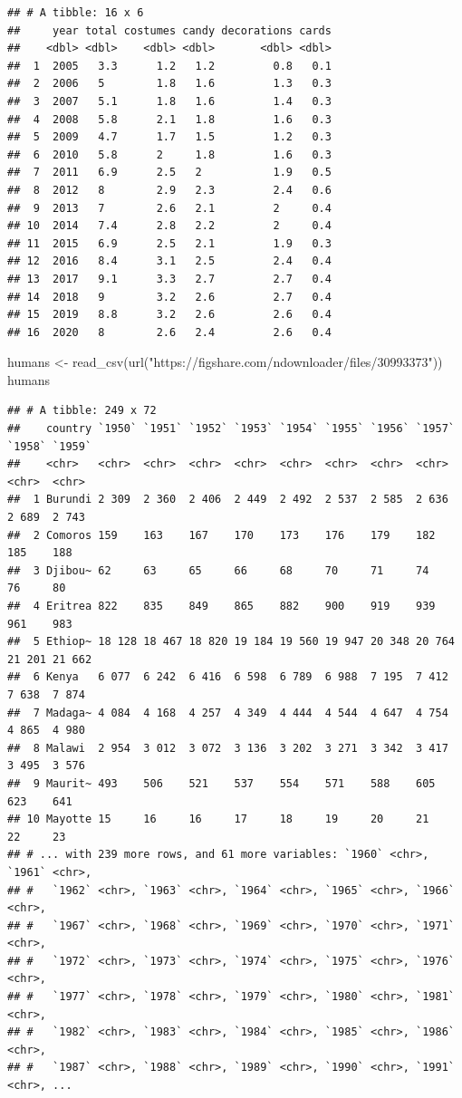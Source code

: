 \documentclass[
]{book}
\newenvironment{Shaded}{\begin{snugshade}}{\end{snugshade}}
\newcommand{\FunctionTok}[1]{\textcolor[rgb]{0.00,0.00,0.00}{#1}}
\newcommand{\NormalTok}[1]{#1}
\newcommand{\OtherTok}[1]{\textcolor[rgb]{0.56,0.35,0.01}{#1}}
\newcommand{\StringTok}[1]{\textcolor[rgb]{0.31,0.60,0.02}{#1}}
\begin{document}
\begin{verbatim}
## # A tibble: 16 x 6
##     year total costumes candy decorations cards
##    <dbl> <dbl>    <dbl> <dbl>       <dbl> <dbl>
##  1  2005   3.3      1.2   1.2         0.8   0.1
##  2  2006   5        1.8   1.6         1.3   0.3
##  3  2007   5.1      1.8   1.6         1.4   0.3
##  4  2008   5.8      2.1   1.8         1.6   0.3
##  5  2009   4.7      1.7   1.5         1.2   0.3
##  6  2010   5.8      2     1.8         1.6   0.3
##  7  2011   6.9      2.5   2           1.9   0.5
##  8  2012   8        2.9   2.3         2.4   0.6
##  9  2013   7        2.6   2.1         2     0.4
## 10  2014   7.4      2.8   2.2         2     0.4
## 11  2015   6.9      2.5   2.1         1.9   0.3
## 12  2016   8.4      3.1   2.5         2.4   0.4
## 13  2017   9.1      3.3   2.7         2.7   0.4
## 14  2018   9        3.2   2.6         2.7   0.4
## 15  2019   8.8      3.2   2.6         2.6   0.4
## 16  2020   8        2.6   2.4         2.6   0.4
\end{verbatim}

\begin{Shaded}
\begin{Highlighting}[]
\NormalTok{humans }\OtherTok{\textless{}{-}} \FunctionTok{read\_csv}\NormalTok{(}\FunctionTok{url}\NormalTok{(}\StringTok{"https://figshare.com/ndownloader/files/30993373"}\NormalTok{))}
\NormalTok{humans}
\end{Highlighting}
\end{Shaded}

\begin{verbatim}
## # A tibble: 249 x 72
##    country `1950` `1951` `1952` `1953` `1954` `1955` `1956` `1957` `1958` `1959`
##    <chr>   <chr>  <chr>  <chr>  <chr>  <chr>  <chr>  <chr>  <chr>  <chr>  <chr> 
##  1 Burundi 2 309  2 360  2 406  2 449  2 492  2 537  2 585  2 636  2 689  2 743 
##  2 Comoros 159    163    167    170    173    176    179    182    185    188   
##  3 Djibou~ 62     63     65     66     68     70     71     74     76     80    
##  4 Eritrea 822    835    849    865    882    900    919    939    961    983   
##  5 Ethiop~ 18 128 18 467 18 820 19 184 19 560 19 947 20 348 20 764 21 201 21 662
##  6 Kenya   6 077  6 242  6 416  6 598  6 789  6 988  7 195  7 412  7 638  7 874 
##  7 Madaga~ 4 084  4 168  4 257  4 349  4 444  4 544  4 647  4 754  4 865  4 980 
##  8 Malawi  2 954  3 012  3 072  3 136  3 202  3 271  3 342  3 417  3 495  3 576 
##  9 Maurit~ 493    506    521    537    554    571    588    605    623    641   
## 10 Mayotte 15     16     16     17     18     19     20     21     22     23    
## # ... with 239 more rows, and 61 more variables: `1960` <chr>, `1961` <chr>,
## #   `1962` <chr>, `1963` <chr>, `1964` <chr>, `1965` <chr>, `1966` <chr>,
## #   `1967` <chr>, `1968` <chr>, `1969` <chr>, `1970` <chr>, `1971` <chr>,
## #   `1972` <chr>, `1973` <chr>, `1974` <chr>, `1975` <chr>, `1976` <chr>,
## #   `1977` <chr>, `1978` <chr>, `1979` <chr>, `1980` <chr>, `1981` <chr>,
## #   `1982` <chr>, `1983` <chr>, `1984` <chr>, `1985` <chr>, `1986` <chr>,
## #   `1987` <chr>, `1988` <chr>, `1989` <chr>, `1990` <chr>, `1991` <chr>, ...
\end{verbatim}
\end{document}
